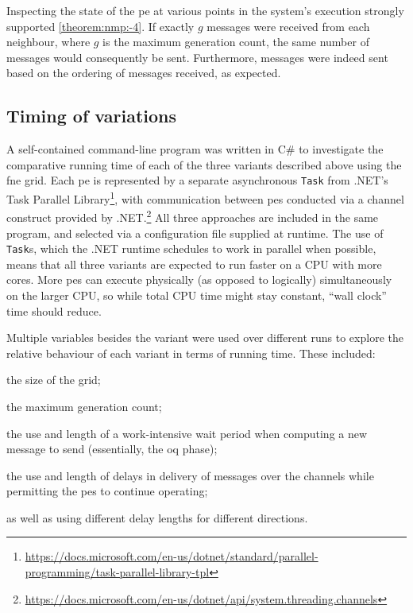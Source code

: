 Inspecting the state of the \gls{pe} at various points in the system's execution strongly supported \cref{theorem:nmp:-4}.  If exactly \(g\) messages were received from each neighbour, where \(g\) is the maximum generation count, the same number of messages would consequently be sent.  Furthermore, messages were indeed sent based on the ordering of messages received, as expected.

\subsection{\label{sec:nmp:timingexp}Timing of variations}
A self-contained command-line program was written in C\# to investigate the comparative running time of each of the three variants described above using the \gls{fne} grid.  Each \gls{pe} is represented by a separate asynchronous \texttt{Task} from .NET's Task Parallel Library{\footnote{\raggedright\url{https://docs.microsoft.com/en-us/dotnet/standard/parallel-programming/task-parallel-library-tpl}}}, with communication between \glspl{pe} conducted via a channel construct provided by .NET.\footnote{\url{https://docs.microsoft.com/en-us/dotnet/api/system.threading.channels}}  All three approaches are included in the same program, and selected via a configuration file supplied at runtime. The use of \texttt{Task}s, which the .NET runtime schedules to work in parallel when possible, means that all three variants are expected to run faster on a CPU with more cores.   More \glspl{pe} can execute physically (as opposed to logically) simultaneously on the larger CPU, so while total CPU time might stay constant, ``wall clock'' time should reduce.

Multiple variables besides the variant were used over different runs to explore the relative behaviour of each variant in terms of running time.  These included:
\begin{inparablank}
\item the size of the grid;
\item the maximum generation count;
\item the use and length of a work-intensive wait period when computing a new message to send (essentially, the \gls{oq} phase);
\item the use and length of delays in delivery of messages over the channels while permitting the \glspl{pe} to continue operating;
\item as well as using different delay lengths for different directions.
\end{inparablank}


